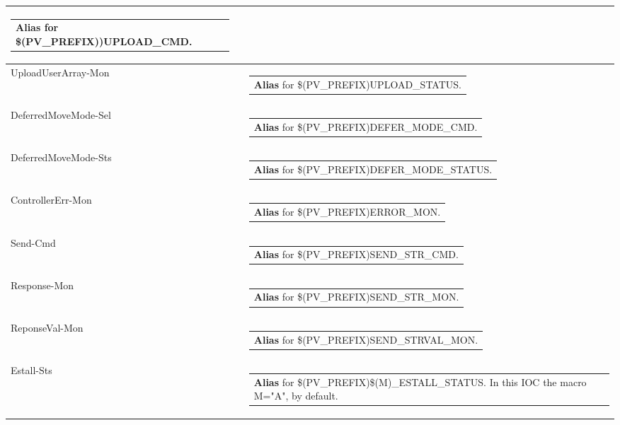 \documentclass[openany]{article}
\begin{document}
\begin{longtable}{| m{4.5cm} m{2.5cm}  m{8.0cm} |}
\begin{tabular}{@{}m{6cm}@{}}
                \textbf{Alias} for \$(PV\_PREFIX))UPLOAD\_CMD.
            \end{tabular} \hypertarget{}{}\\ \hline
        UploadUserArray-Mon &  & \begin{tabular}{@{}m{6cm}@{}}
                \textbf{Alias} for \$(PV\_PREFIX)UPLOAD\_STATUS.
            \end{tabular} \hypertarget{}{}\\ \hline
        DeferredMoveMode-Sel &  & \begin{tabular}{@{}m{6cm}@{}}
                \textbf{Alias} for \$(PV\_PREFIX)DEFER\_MODE\_CMD.
            \end{tabular} \hypertarget{}{}\\ \hline
        DeferredMoveMode-Sts &  & \begin{tabular}{@{}m{6cm}@{}}
                \textbf{Alias} for \$(PV\_PREFIX)DEFER\_MODE\_STATUS.
            \end{tabular} \hypertarget{}{}\\ \hline
        ControllerErr-Mon &  & \begin{tabular}{@{}m{6cm}@{}}
                \textbf{Alias} for \$(PV\_PREFIX)ERROR\_MON.
            \end{tabular} \hypertarget{}{}\\ \hline
        Send-Cmd &  & \begin{tabular}{@{}m{6cm}@{}}
                \textbf{Alias} for \$(PV\_PREFIX)SEND\_STR\_CMD.
            \end{tabular} \hypertarget{}{}\\ \hline
        Response-Mon &  & \begin{tabular}{@{}m{6cm}@{}}
                \textbf{Alias} for \$(PV\_PREFIX)SEND\_STR\_MON.
            \end{tabular} \hypertarget{}{}\\ \hline
        ReponseVal-Mon &  & \begin{tabular}{@{}m{6cm}@{}}
                \textbf{Alias} for \$(PV\_PREFIX)SEND\_STRVAL\_MON.
            \end{tabular} \hypertarget{}{}\\ \hline
        Estall-Sts &  & \begin{tabular}{@{}m{6cm}@{}}
                \textbf{Alias} for \$(PV\_PREFIX)\$(M)\_ESTALL\_STATUS. In this IOC the macro M="A", by default.

\end{tabular}
\end{longtable}
\end{document}
